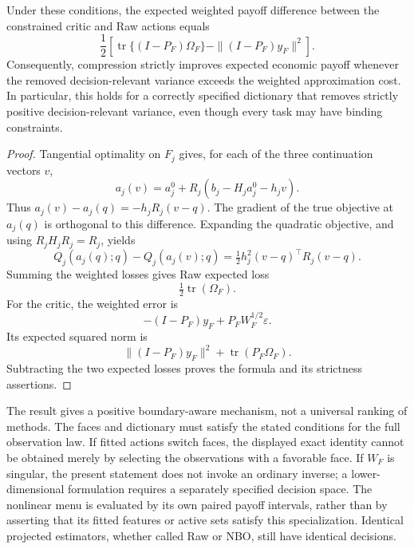 \begin{proposition}
\label{prop:r16activefacevalue}
Under these conditions, the expected weighted payoff difference between the constrained critic and Raw actions equals
\begin{equation}
 \frac12\left[\operatorname{tr}\{(I-P_F)\Omega_F\}
                  -\|(I-P_F)y_F\|^2\right].
 \label{eq:r16activefacevalue}
\end{equation}
Consequently, compression strictly improves expected economic payoff whenever the removed decision-relevant variance exceeds the weighted approximation cost. In particular, this holds for a correctly specified dictionary that removes strictly positive decision-relevant variance, even though every task may have binding constraints.
\end{proposition}
\begin{proof}
Tangential optimality on $F_j$ gives, for each of the three continuation vectors $v$,
\[
 a_j(v)=a_j^0+R_j(b_j-H_ja_j^0-h_jv).
\]
Thus $a_j(v)-a_j(q)=-h_jR_j(v-q)$. The gradient of the true objective at $a_j(q)$ is orthogonal to this difference. Expanding the quadratic objective, and using $R_jH_jR_j=R_j$, yields
\[
 Q_j(a_j(q);q)-Q_j(a_j(v);q)
       =\tfrac12 h_j^2(v-q)^\top R_j(v-q).
\]
Summing the weighted losses gives Raw expected loss
\[
 \tfrac12\operatorname{tr}(\Omega_F).
\]
For the critic, the weighted error is
\[
 -(I-P_F)y_F+P_FW_F^{1/2}\varepsilon.
\]
Its expected squared norm is
\[
 \|(I-P_F)y_F\|^2+\operatorname{tr}(P_F\Omega_F).
\]
Subtracting the two expected losses proves the formula and its strictness assertions.
\end{proof}

The result gives a positive boundary-aware mechanism, not a universal ranking of methods. The faces and dictionary must satisfy the stated conditions for the full observation law. If fitted actions switch faces, the displayed exact identity cannot be obtained merely by selecting the observations with a favorable face. If $W_F$ is singular, the present statement does not invoke an ordinary inverse; a lower-dimensional formulation requires a separately specified decision space. The nonlinear menu is evaluated by its own paired payoff intervals, rather than by asserting that its fitted features or active sets satisfy this specialization. Identical projected estimators, whether called Raw or NBO, still have identical decisions.
